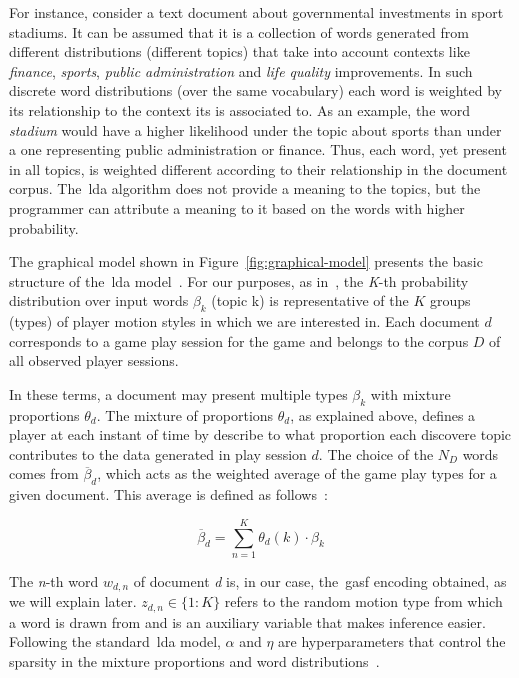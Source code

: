 

For instance, consider a text document about governmental investments in sport stadiums. It can be assumed that it is a collection of words generated from different distributions (different topics) that take into account contexts like \textit{finance}, \textit{sports}, \textit{public administration} and \textit{life quality} improvements. In such discrete word distributions (over the same vocabulary) each word is weighted by its relationship to the context its is associated to. As an example, the word \textit{stadium} would have a higher likelihood under the topic about sports than under a one representing public administration or finance. Thus, each word, yet present in all topics, is weighted different according to their relationship in the document corpus. The~\glsdesc{lda} algorithm does not provide a meaning to the topics, but the programmer can attribute a meaning to it based on the words with higher probability.

The graphical model shown in Figure~\ref{fig:graphical-model} presents the basic structure of the~\gls{lda} model~\citep{blei_latent_2003}. For our purposes, as in~\cite{smith_mining_2016}, the \textit{K}-th probability distribution over input words $\beta_{k}$ (topic k) is representative of the $K$ groups (types) of player motion styles in which we are interested in. Each document $d$ corresponds to a game play session for the game and belongs to the corpus $D$ of all observed player sessions.

In these terms, a document may present multiple types $\beta_{k}$ with mixture proportions $\theta_{d}$. The mixture of proportions $\theta_{d}$, as explained above, defines a player at each instant of time by describe to what proportion each discovere topic contributes to the data generated in play session $d$. The choice of the $N_{D}$ words comes from $\overline{\beta}_{d}$, which acts as the weighted average of the game play types for a given document. This average is defined as follows~\citep{blei_latent_2003,smith_mining_2016}:

\begin{equation}
\overline{\beta}_{d} = \sum_{n=1}^{K} \theta_{d}(k) \cdot \beta_{k}
\end{equation}

The \textit{n}-th word $w_{d,n}$ of document \textit{d} is, in our case, the~\gls{gasf} encoding obtained, as we will explain later. $z_{d,n} \in \{1:K\}$ refers to the random motion type from which a word is drawn from and is an auxiliary variable that makes inference easier. Following the standard~\gls{lda} model, $\alpha$ and $\eta$ are hyperparameters that control the sparsity in the mixture proportions and word distributions~\citep{smith_mining_2016}.

